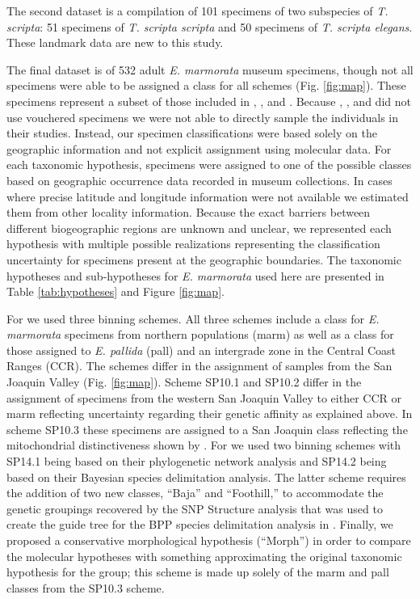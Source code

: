 \documentclass[12pt,letterpaper]{article}
\begin{document}
The second dataset is a compilation of 101 specimens of two subspecies of \textit{T. scripta}: 51 specimens of \textit{T. scripta scripta} and 50 specimens of \textit{T. scripta elegans}. These landmark data are new to this study. 

The final dataset is of 532 adult \textit{E. marmorata} museum specimens, though not all specimens were able to be assigned a class for all schemes (Fig. \ref{fig:map}). These specimens represent a subset of those included in \citet{Angielczyk2007}, \citet{Angielczyk2011}, and \citet{Angielczyk2013a}. Because  \citet{Spinks2005}, \citet{Spinks2010}, and \citet{Spinks2014} did not use vouchered specimens we were not able to directly sample the individuals in their studies. Instead, our specimen classifications were based solely on the geographic information and not explicit assignment using molecular data. For each taxonomic hypothesis, specimens were assigned to one of the possible classes based on geographic occurrence data recorded in museum collections. In cases where precise latitude and longitude information were not available we estimated them from other locality information. Because the exact barriers between different biogeographic regions are unknown and unclear, we represented each hypothesis with multiple possible realizations representing the classification uncertainty for specimens present at the geographic boundaries. The taxonomic hypotheses and sub-hypotheses for \textit{E. marmorata} used here are presented in Table \ref{tab:hypotheses} and Figure \ref{fig:map}.

For \citet{Spinks2010} we used three binning schemes. All three schemes include a class for \textit{E. marmorata} specimens from northern populations (marm) as well as a class for those assigned to \textit{E. pallida} (pall) and an intergrade zone in the Central Coast Ranges (CCR). The schemes differ in the assignment of samples from the San Joaquin Valley (Fig. \ref{fig:map}). Scheme SP10.1 and SP10.2 differ in the assignment of specimens from the western San Joaquin Valley to either CCR or marm reflecting uncertainty regarding their genetic affinity as explained above. In scheme SP10.3 these specimens are assigned to a San Joaquin class reflecting the mitochondrial distinctiveness shown by \citet{Spinks2005}. For \citet{Spinks2014} we used two binning schemes with SP14.1 being based on their phylogenetic network analysis and SP14.2 being based on their Bayesian species delimitation analysis. The latter scheme requires the addition of two new classes, ``Baja'' and ``Foothill,'' to accommodate the genetic groupings recovered by the SNP Structure analysis that was used to create the guide tree for the BPP species delimitation analysis in \citet{Spinks2014}. Finally, we proposed a conservative morphological hypothesis (``Morph'') in order to compare the molecular hypotheses with something approximating the original taxonomic hypothesis for the group; this scheme is made up solely of the marm and pall classes from the SP10.3 scheme.
\end{document}
